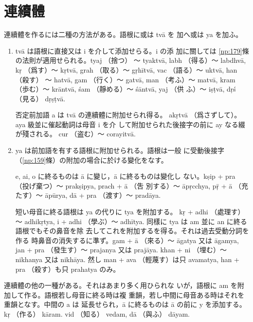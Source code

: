 \section{連續體}
\numberParagraph
連續體を作るには二種の方法がある。語根に或は tvā を
加へ或は ya を加ふ。

\begin{enumerate}[label=(\alph*)]
\item tvā は語根に直接又は i を介して添加せらる。i の添
加に關しては \ref{np:179}條の法則が適用せられる。tyaj （捨つ）
～ tyaktvā, labh （得る）～ labdhvā, kṛ （爲す）～ kṛtvā,
grah （取る）～ gṛhītvā, vac （語る）～ uktvā, han （殺す）
～ hatvā, gam （行く）～ gatvā, man （考ふ）～ matvā,
kram （歩む）～ krāntvā, śam （靜める）～ śāntvā, yaj （供
ふ）～ iṣṭvā, dṛś （見る） dṛṣṭvā.

否定前加語 a は tvā の連續體に附加せられ得る。
akṛtvā （爲さずして）。aya 級並に催起動詞は母音 i を介
して附加せられた後接字の前に ay なる綴が殘される。
cur （盗む）～ corayitvā.
\item ya は前加語を有する語根に附加せられる。語根は一般
に受動後接字（\ref{np:159}條）の附加の場合に於ける變化をなす。

e, ai, o に終るものは ā に變じ，ā に終るものは變化し
ない。kṣip + pra （投げ棄つ）～ prakṣipya, prach + ā （吿
別する）～ āpṛcchya, pṝ + ā （充たす）～ āpūrya, dā + pra
（渡す）～ pradāya.

短い母音に終る語根は ya の代りに tya を附加する。
kṛ + adhi （處理す）～ adhikṛtya, i + adhi （學ぶ）～ adhītya.
同樣に tya は am 並に an に終る語根でもその鼻音を除
去してこれを附加するを得る。それは過去受動分詞を作る
時鼻音の消失するに準ず。gam + ā （來る）～ āgatya 又は
āgamya, jan + pra （發生す）～ prajanya 又は prajāya.
khan + ni （埋む）～ nikhanya 又は nikhāya. 然し man +
ava （輕蔑す）は只 avamatya, han + pra （殺す）も只
prahatya のみ。
\end{enumerate}

\numberParagraph
連續體の他の一種がある。それはあまり多く用ひられな
いが，語根に am を附加して作る。語根若し母音に終る時は複
重韻，若し中間に母音ある時はそれを重韻となす。中間の a は
延長せられ，ā に終るものは ā の前に y を添加する。kṛ （作る）
kāram. vid （知る） vedam, dā （與ふ） dāyam.

